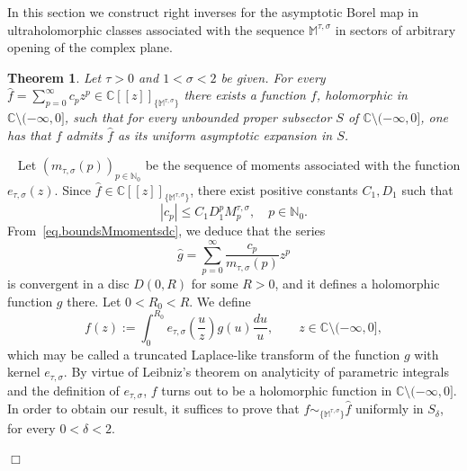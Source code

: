 \documentclass[12pt,leqno]{amsart}
\def\C{\mathbb{C}}
\def\N{\mathbb{N}}
\theoremstyle{plain}
\newtheorem{theo}{Theorem}[section]
\theoremstyle{definition}
\numberwithin{equation}{section}
\def\bM{\mathbb{M}}
\def\M{\mathbb{M}}
\newenvironment{proof1}{\medskip\par\noindent{\bf Proof}\ \normalfont}{\hfill $\Box$
\medskip\par}
\begin{document}
In this section we construct right inverses for the asymptotic Borel map in ultraholomorphic classes associated with the sequence $\M^{\tau,\sigma}$ in sectors of arbitrary opening of the complex plane.


\begin{theo}\label{tpral}
Let  $\tau>0$ and $1<\sigma<2$ be given. For every $\hat{f}=\sum_{p=0}^{\infty}c_p z^p\in \C[[z]]_{\{\M^{\tau,\sigma}\}}$  there exists a function $f$, holomorphic in $\C\setminus(-\infty,0]$, such that for every unbounded proper subsector $S$ of $\C\setminus(-\infty,0]$, one has that $f$ admits $\hat{f}$ as its uniform asymptotic expansion in $S$.
\end{theo}

\begin{proof1} Let $(m_{\tau,\sigma}(p))_{p\in\N_0}$ be the sequence of moments associated  with the function $e_{\tau,\sigma}(z)$.
Since $\hat{f} \in \C[[z]]_{\{\M^{\tau,\sigma}\}}$, there exist positive constants $C_1,D_1$ such that
$$|c_p|\le C_1D_1^{p} M^{\tau,\sigma}_p,\quad p\in\N_0.$$
From~\eqref{eq.boundsMmomentsdc}, we deduce that the series
$$
\hat{g}=\sum_{p=0}^{\infty}\frac{c_p}{m_{\tau,\sigma}(p)}z^p
$$
is convergent in a disc $D(0,R)$ for some $R>0$, and it defines a holomorphic function $g$ there. Let $0<R_0<R$.
We define
\begin{equation}\label{intope}
f(z):=\int_{0}^{R_0}e_{\tau,\sigma}\left(\frac{u}{z}\right)g(u)\frac{du}{u},\qquad z\in \C\setminus(-\infty,0],
\end{equation}
which may be called a truncated Laplace-like transform of the function $g$ with kernel $e_{\tau,\sigma}$.
By virtue of Leibniz's theorem on analyticity of parametric integrals and the definition of $e_{\tau,\sigma}$, $f$ turns out to be a holomorphic function in $\C\setminus(-\infty,0]$. In order to obtain our result, it suffices to prove that
$f\sim_{\{\M^{\tau,\sigma}\}}\hat{f}$ uniformly in $S_{\delta}$, for every $0<\delta<2$.


\end{proof1}
\end{document}
